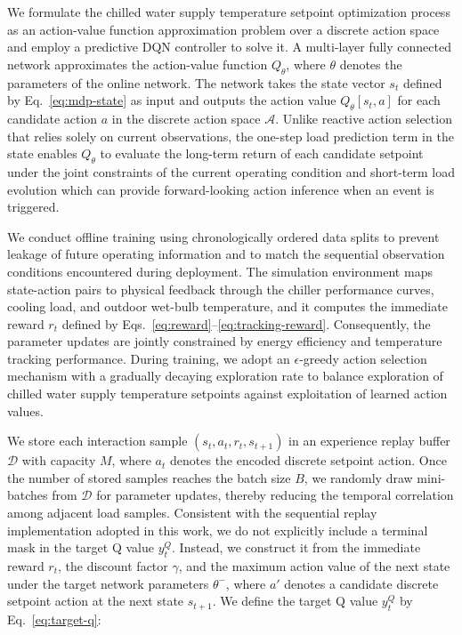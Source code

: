 ﻿\documentclass[preprint,12pt,number]{elsarticle}
\begin{document}
We formulate the chilled water supply temperature setpoint optimization process as an action-value function approximation problem over a discrete action space and employ a predictive DQN controller to solve it. A multi-layer fully connected network approximates the action-value function \(Q_{\theta}\), where \(\theta\) denotes the parameters of the online network. The network takes the state vector \(s_t\) defined by Eq.~\eqref{eq:mdp-state} as input and outputs the action value \(Q_{\theta}[s_t,a]\) for each candidate action \(a\) in the discrete action space \(\mathcal{A}\). Unlike reactive action selection that relies solely on current observations, the one-step load prediction term in the state enables \(Q_{\theta}\) to evaluate the long-term return of each candidate setpoint under the joint constraints of the current operating condition and short-term load evolution which can provide forward-looking action inference when an event is triggered.

We conduct offline training using chronologically ordered data splits to prevent leakage of future operating information and to match the sequential observation conditions encountered during deployment. The simulation environment maps state-action pairs to physical feedback through the chiller performance curves, cooling load, and outdoor wet-bulb temperature, and it computes the immediate reward \(r_t\) defined by Eqs.~\eqref{eq:reward}--\eqref{eq:tracking-reward}. Consequently, the parameter updates are jointly constrained by energy efficiency and temperature tracking performance. During training, we adopt an \(\epsilon\)-greedy action selection mechanism with a gradually decaying exploration rate to balance exploration of chilled water supply temperature setpoints against exploitation of learned action values.

We store each interaction sample \((s_t,a_t,r_t,s_{t+1})\) in an experience replay buffer \(\mathcal{D}\) with capacity \(M\), where \(a_t\) denotes the encoded discrete setpoint action. Once the number of stored samples reaches the batch size \(B\), we randomly draw mini-batches from \(\mathcal{D}\) for parameter updates, thereby reducing the temporal correlation among adjacent load samples. Consistent with the sequential replay implementation adopted in this work, we do not explicitly include a terminal mask in the target Q value \(y_t^{Q}\). Instead, we construct it from the immediate reward \(r_t\), the discount factor \(\gamma\), and the maximum action value of the next state under the target network parameters \(\theta^{-}\), where \(a'\) denotes a candidate discrete setpoint action at the next state \(s_{t+1}\). We define the target Q value \(y_t^{Q}\) by Eq.~\eqref{eq:target-q}:
\end{document}
